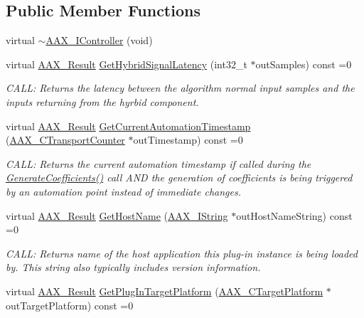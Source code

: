 \subsection*{Public Member Functions}
\begin{DoxyCompactItemize}
\item 
virtual \mbox{\hyperlink{a01789_aa8dee55f260a0f92f29b95f9d7acc9dd}{$\sim$\+A\+A\+X\+\_\+\+I\+Controller}} (void)
\item 
virtual \mbox{\hyperlink{a00392_a4d8f69a697df7f70c3a8e9b8ee130d2f}{A\+A\+X\+\_\+\+Result}} \mbox{\hyperlink{a00805_ga47b471c438fcad0798964b860d74609e}{Get\+Hybrid\+Signal\+Latency}} (int32\+\_\+t $\ast$out\+Samples) const =0
\begin{DoxyCompactList}\small\item\em C\+A\+LL\+: Returns the latency between the algorithm normal input samples and the inputs returning from the hyrbid component. \end{DoxyCompactList}\item 
virtual \mbox{\hyperlink{a00392_a4d8f69a697df7f70c3a8e9b8ee130d2f}{A\+A\+X\+\_\+\+Result}} \mbox{\hyperlink{a01789_af9ab9b228023e116f89249a56c27a20f}{Get\+Current\+Automation\+Timestamp}} (\mbox{\hyperlink{a00392_ac09cd6857748cc296ac0f8bcc20dc74b}{A\+A\+X\+\_\+\+C\+Transport\+Counter}} $\ast$out\+Timestamp) const =0
\begin{DoxyCompactList}\small\item\em C\+A\+LL\+: Returns the current automation timestamp if called during the \mbox{\hyperlink{a01669_a083265b008921b6114ede387711694b7}{Generate\+Coefficients()}} call A\+ND the generation of coefficients is being triggered by an automation point instead of immediate changes. \end{DoxyCompactList}\item 
virtual \mbox{\hyperlink{a00392_a4d8f69a697df7f70c3a8e9b8ee130d2f}{A\+A\+X\+\_\+\+Result}} \mbox{\hyperlink{a01789_ad2a002a133491b2ed572054588641e78}{Get\+Host\+Name}} (\mbox{\hyperlink{a01873}{A\+A\+X\+\_\+\+I\+String}} $\ast$out\+Host\+Name\+String) const =0
\begin{DoxyCompactList}\small\item\em C\+A\+LL\+: Returns name of the host application this plug-\/in instance is being loaded by. This string also typically includes version information. \end{DoxyCompactList}\item 
virtual \mbox{\hyperlink{a00392_a4d8f69a697df7f70c3a8e9b8ee130d2f}{A\+A\+X\+\_\+\+Result}} \mbox{\hyperlink{a01789_a8326b2acec2d9c9039853adafd9b2bef}{Get\+Plug\+In\+Target\+Platform}} (\mbox{\hyperlink{a00392_a8f2cefa455217fa9f3ce190fe5fd8033}{A\+A\+X\+\_\+\+C\+Target\+Platform}} $\ast$out\+Target\+Platform) const =0

\end{DoxyCompactItemize}
